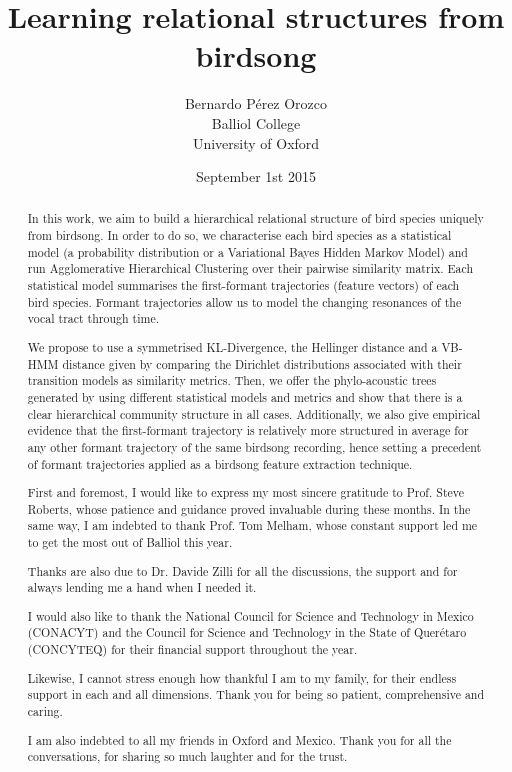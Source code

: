 \documentclass[pdftex,12pt,a4paper]{report}
\title{Learning relational structures from birdsong}
\author{Bernardo Pérez Orozco\\Balliol College\\University of Oxford}
\date{ September 1st 2015 }
\theoremstyle{definition}
\theoremstyle{remark}
\begin{document}
 

\begin{abstract}
In this work, we aim to build a hierarchical relational structure of bird species uniquely from birdsong. In order to do so, we characterise each bird species as a statistical model (a probability distribution or a Variational Bayes Hidden Markov Model) and run Agglomerative Hierarchical Clustering over their pairwise similarity matrix. Each statistical model summarises the first-formant trajectories (feature vectors) of each bird species. Formant trajectories allow us to model the changing resonances of the vocal tract through time.
\par We propose to use a symmetrised KL-Divergence, the Hellinger distance and a VB-HMM distance given by comparing the Dirichlet distributions associated with their transition models as similarity metrics. Then, we offer the phylo-acoustic trees generated by using different statistical models and metrics and show that there is a clear hierarchical community structure in all cases. Additionally, we also give empirical evidence that the first-formant trajectory is relatively more structured in average for any other formant trajectory of the same birdsong recording, hence setting a precedent of formant trajectories applied as a birdsong feature extraction technique.
\end{abstract}

\renewcommand{\abstractname}{Acknowledgements}
\begin{abstract}
First and foremost, I would like to express my most sincere gratitude to Prof. Steve Roberts, whose patience and guidance proved invaluable during these months. In the same way, I am indebted to thank Prof. Tom Melham, whose constant support led me to get the most out of Balliol this year.
\par Thanks are also due to Dr. Davide Zilli for all the discussions, the support and for always lending me a hand when I needed it.
\par I would also like to thank the National Council for Science and Technology in Mexico (CONACYT) and the Council for Science and Technology in the State of Querétaro (CONCYTEQ) for their financial support throughout the year.
\par Likewise, I cannot stress enough how thankful I am to my family, for their endless support in each and all dimensions. Thank you for being so patient, comprehensive and caring. 
\par I am also indebted to all my friends in Oxford and Mexico. Thank you for all the conversations, for sharing so much laughter and for the trust. 
\end{abstract}
\end{document}
